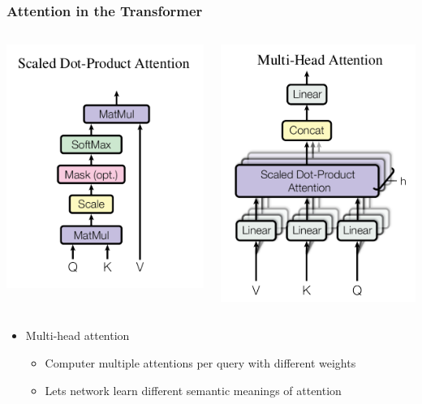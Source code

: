 \documentclass[10pt]{beamer}
\begin{document}
\begin{frame}
  \frametitle{Attention in the Transformer}

  \begin{columns}
\begin{center}
	\includegraphics[width=.55\columnwidth]{images/att1}
\end{center}
\begin{center}
	\includegraphics[width=.47\columnwidth]{images/att2}
\end{center}
    \end{columns}
\begin{itemize}
\item Multi-head attention
\begin{itemize}
\item Computer multiple attentions per query with different weights
\item Lets network learn different semantic meanings of attention
\end{itemize}
\end{itemize}
\end{frame}
\end{document}
